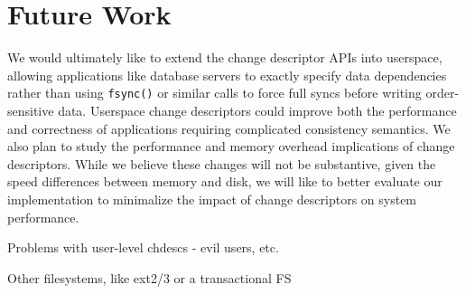 \preparagraphspacing{}
\section*{Future Work}
\label{sec:future}

We would ultimately like to extend the change descriptor APIs into userspace,
allowing applications like database servers to exactly specify data dependencies
rather than using \verb+fsync()+ or similar calls to force full syncs before
writing order-sensitive data. Userspace change descriptors could improve both
the performance and correctness of applications requiring complicated
consistency semantics. We also plan to study the performance and memory overhead
implications of change descriptors. While we believe these changes will not be
substantive, given the speed differences between memory and disk, we will like
to better evaluate our implementation to minimalize the impact of change
descriptors on system performance.

Problems with user-level chdescs - evil users, etc.

Other filesystems, like ext2/3 or a transactional FS
